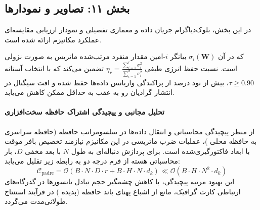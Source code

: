 \subsection*{بخش ۱۱: تصاویر و نمودارها }
در این بخش، بلوک‌دیاگرام جریان داده و معماری تفصیلی و نمودار ارزیابی مقایسه‌ای عملکرد مکانیزم  ارائه شده است.



که در آن $\sigma_i(\mathbf{W})$ بیانگر $i$-امین مقدار منفرد مرتب‌شده ماتریس به صورت نزولی است. نسبت حفظ انرژی طیفی $\eta_r = \frac{\sum_{i=1}^r \sigma_i^2}{\sum_{i=1}^{d} \sigma_i^2}$ تضمین می‌کند که با انتخاب آستانه $\tau \ge 0.90$، بیش از نود درصد از پراکندگی واریانس داده‌ها حفظ شده و افت سیگنال در انتشار گرادیان رو به عقب به حداقل ممکن کاهش می‌یابد.

\paragraph{تحلیل مجانبی و پیچیدگی اشتراک حافظه سخت‌افزاری}
از منظر پیچیدگی محاسباتی و انتقال داده‌ها در سلسومراتب حافظه (حافظه سراسری  به حافظه محلی )، عملیات ضرب ماتریسی در این مکانیزم نیازمند تخصیص بافر موقت با ابعاد فاکتورگیری‌شده است. برای پردازش دنباله‌ای به طول $N$ با بعد مخفی $D$، بار محاسباتی هسته از فرم درجه دو به رابطه زیر تقلیل می‌یابد:
\begin{equation}
\label{eq:complexity_padre}
\mathcal{C}_{\text{padre}} = \mathcal{O}\left( B \cdot N \cdot D \cdot r + B \cdot H \cdot N \cdot d_k \right) \ll \mathcal{O}\left( B \cdot H \cdot N^2 \cdot d_k \right)
\end{equation}
این بهبود مرتبه پیچیدگی، با کاهش چشمگیر حجم تبادل تانسورها در گذرگاه‌های ارتباطی کارت گرافیک، مانع از اشباع پهنای باند حافظه (پدیده ) در فرآیند استنتاج طولانی‌مدت می‌گردد.